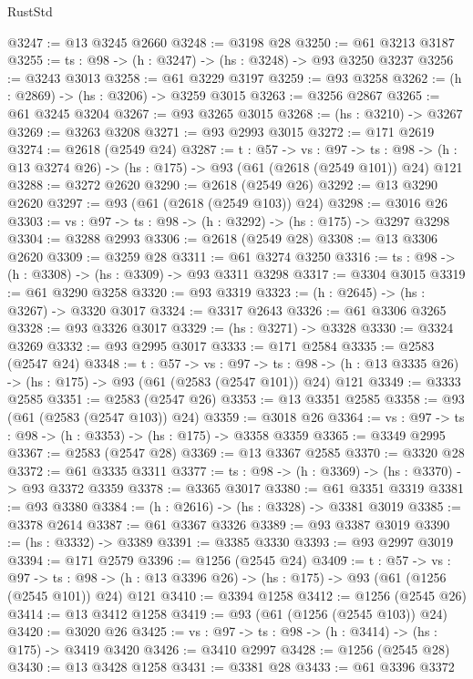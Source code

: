 \begin{lexlean}{RustStd}
\begin{coremodule}
@3247 := @13 @3245 @2660
@3248 := @3198 @28
@3250 := @61 @3213 @3187
@3255 := {ts : @98} -> (h : @3247) -> (hs : @3248) -> @93 @3250 @3237
@3256 := @3243 @3013
@3258 := @61 @3229 @3197
@3259 := @93 @3258
@3262 := (h : @2869) -> (hs : @3206) -> @3259 @3015
@3263 := @3256 @2867
@3265 := @61 @3245 @3204
@3267 := @93 @3265 @3015
@3268 := (hs : @3210) -> @3267
@3269 := @3263 @3208
@3271 := @93 @2993 @3015
@3272 := @171 @2619
@3274 := @2618 (@2549 @24)
@3287 := {t : @57} ->
  {vs : @97} ->
  {ts : @98} -> (h : @13 @3274 @26) -> (hs : @175) -> @93 (@61 (@2618 (@2549 @101)) @24) @121
@3288 := @3272 @2620
@3290 := @2618 (@2549 @26)
@3292 := @13 @3290 @2620
@3297 := @93 (@61 (@2618 (@2549 @103)) @24)
@3298 := @3016 @26
@3303 := {vs : @97} -> {ts : @98} -> (h : @3292) -> (hs : @175) -> @3297 @3298
@3304 := @3288 @2993
@3306 := @2618 (@2549 @28)
@3308 := @13 @3306 @2620
@3309 := @3259 @28
@3311 := @61 @3274 @3250
@3316 := {ts : @98} -> (h : @3308) -> (hs : @3309) -> @93 @3311 @3298
@3317 := @3304 @3015
@3319 := @61 @3290 @3258
@3320 := @93 @3319
@3323 := (h : @2645) -> (hs : @3267) -> @3320 @3017
@3324 := @3317 @2643
@3326 := @61 @3306 @3265
@3328 := @93 @3326 @3017
@3329 := (hs : @3271) -> @3328
@3330 := @3324 @3269
@3332 := @93 @2995 @3017
@3333 := @171 @2584
@3335 := @2583 (@2547 @24)
@3348 := {t : @57} ->
  {vs : @97} ->
  {ts : @98} -> (h : @13 @3335 @26) -> (hs : @175) -> @93 (@61 (@2583 (@2547 @101)) @24) @121
@3349 := @3333 @2585
@3351 := @2583 (@2547 @26)
@3353 := @13 @3351 @2585
@3358 := @93 (@61 (@2583 (@2547 @103)) @24)
@3359 := @3018 @26
@3364 := {vs : @97} -> {ts : @98} -> (h : @3353) -> (hs : @175) -> @3358 @3359
@3365 := @3349 @2995
@3367 := @2583 (@2547 @28)
@3369 := @13 @3367 @2585
@3370 := @3320 @28
@3372 := @61 @3335 @3311
@3377 := {ts : @98} -> (h : @3369) -> (hs : @3370) -> @93 @3372 @3359
@3378 := @3365 @3017
@3380 := @61 @3351 @3319
@3381 := @93 @3380
@3384 := (h : @2616) -> (hs : @3328) -> @3381 @3019
@3385 := @3378 @2614
@3387 := @61 @3367 @3326
@3389 := @93 @3387 @3019
@3390 := (hs : @3332) -> @3389
@3391 := @3385 @3330
@3393 := @93 @2997 @3019
@3394 := @171 @2579
@3396 := @1256 (@2545 @24)
@3409 := {t : @57} ->
  {vs : @97} ->
  {ts : @98} -> (h : @13 @3396 @26) -> (hs : @175) -> @93 (@61 (@1256 (@2545 @101)) @24) @121
@3410 := @3394 @1258
@3412 := @1256 (@2545 @26)
@3414 := @13 @3412 @1258
@3419 := @93 (@61 (@1256 (@2545 @103)) @24)
@3420 := @3020 @26
@3425 := {vs : @97} -> {ts : @98} -> (h : @3414) -> (hs : @175) -> @3419 @3420
@3426 := @3410 @2997
@3428 := @1256 (@2545 @28)
@3430 := @13 @3428 @1258
@3431 := @3381 @28
@3433 := @61 @3396 @3372

\end{coremodule}
\end{lexlean}
